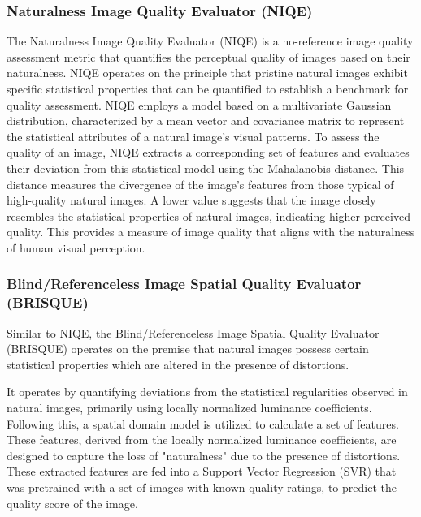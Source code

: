 

        

        \subsubsection{Naturalness Image Quality Evaluator (NIQE)}

        
            The Naturalness Image Quality Evaluator (NIQE) \cite{niqe} is a no-reference image quality assessment metric that quantifies the perceptual quality of images based on their naturalness.
            NIQE operates on the principle that pristine natural images exhibit specific statistical properties that can be quantified to establish a benchmark for quality assessment. 
            NIQE employs a model based on a multivariate Gaussian distribution, characterized by a mean vector and covariance matrix to represent the statistical attributes of a natural image's visual patterns.
            To assess the quality of an image, NIQE extracts a corresponding set of features and evaluates their deviation from this statistical model using the Mahalanobis distance.
            This distance measures the divergence of the image's features from those typical of high-quality natural images.
            A lower value suggests that the image closely resembles the statistical properties of natural images, indicating higher perceived quality. This provides a measure of image quality that aligns with the naturalness of human visual perception. 

        \subsubsection{Blind/Referenceless Image Spatial Quality Evaluator (BRISQUE)}

            Similar to NIQE, the Blind/Referenceless Image Spatial Quality Evaluator (BRISQUE) \cite{mittal2012} operates on the premise that natural images possess certain statistical properties which are altered in the presence of distortions. 
            
            It operates by quantifying deviations from the statistical regularities observed in natural images, primarily using locally normalized luminance coefficients. 
            Following this, a spatial domain model is utilized to calculate a set of features. 
            These features, derived from the locally normalized luminance coefficients, are designed to capture the loss of "naturalness" due to the presence of distortions.
            These extracted features are fed into a Support Vector Regression (SVR) that was pretrained with a set of images with known quality ratings, to predict the quality score of the image.
            
